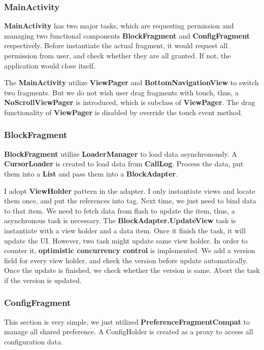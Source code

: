 \documentclass{article}
\begin{document}
\subsubsection{MainActivity}
\textbf{MainActivity} has two major tasks, which are requesting permission and managing two functional components \textbf{BlockFragment} and \textbf{ConfigFragment} respectively. Before instantiate the actual fragment, it would request all permission from user, and check whether they are all granted. If not, the application would close itself.

The \textbf{MainActivity} utilize \textbf{ViewPager} and \textbf{BottomNavigationView} to switch two fragments. But we do not wish user drag fragments with touch, thus, a \textbf{NoScrollViewPager} is introduced, which is subclass of \textbf{ViewPager}. The drag functionality of \textbf{ViewPager} is disabled by override the touch event method.

\subsubsection{BlockFragment}
\textbf{BlockFragment} utilize \textbf{LoaderManager} to load data asynchronously. A \textbf{CursorLoader} is created to load data from \textbf{CallLog}. Process the data, put them into a \textbf{List} and pass them into a \textbf{BlockAdapter}.

I adopt \textbf{ViewHolder} pattern in the adapter. I only instantiate views and locate them once, and put the references into tag.  Next time, we just need to bind data to that item. We need to fetch data from flash to update the item, thus, a asynchronous task is necessary. The \textbf{BlockAdapter.UpdateView} task is instantiate with a view holder and a data item. Once it finish the task, it will update the UI. However, two task might update same view holder. In order to counter it, \textbf{optimistic concurrency control} is implemented. We add a version field for every view holder, and check the version before update automatically. Once the update is finished, we check whether the version is same. Abort the task if the version is updated. 

\subsubsection{ConfigFragment}
This section is very simple, we just utilized \textbf{PreferenceFragmentCompat} to manage all shared preference. A ConfigHolder is created as a proxy to access all configuration data.
\end{document}
